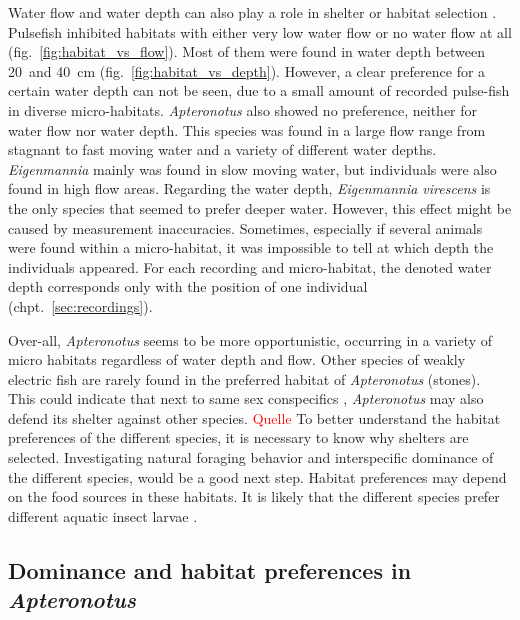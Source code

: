 Water flow and water depth can also play a role in shelter or habitat selection \citep{aadland1993stream}. Pulsefish inhibited habitats with either very low water flow or no water flow at all (fig.~\ref{fig:habitat_vs_flow}).  Most of them were found in water depth between 20~and 40~cm (fig.~\ref{fig:habitat_vs_depth}). However, a clear preference for a certain water depth can not be seen, due to a small amount of recorded pulse-fish in diverse micro-habitats.
\textit{Apteronotus} also showed no preference, neither for water flow nor water depth. This species was found in a large flow range from stagnant to fast moving water and a variety of different water depths.
\textit{Eigenmannia} mainly was found in slow moving water, but individuals were also found in high flow areas. Regarding the water depth, \textit{Eigenmannia virescens} is the only species that seemed to prefer deeper water. However, this effect might be caused by measurement inaccuracies. Sometimes, especially if several animals were found within a micro-habitat, it was impossible to tell at which depth the individuals appeared. For each recording and micro-habitat, the denoted water depth corresponds only with the position of one individual (chpt.~\ref{sec:recordings}).

Over-all, \textit{Apteronotus} seems to be more opportunistic, occurring in a variety of micro habitats regardless of water depth and flow. Other species of weakly electric fish are rarely found in the preferred habitat of \textit{Apteronotus} (stones). This could indicate that next to same sex conspecifics \citep{raab2019}, \textit{Apteronotus} may also defend its shelter against other species. \textcolor{red}{Quelle}
To better understand the habitat preferences of the different species,  it is necessary to know why shelters are selected. Investigating natural foraging behavior and interspecific dominance of the different species, would be a good next step. Habitat preferences may depend on the food sources in these habitats. It is likely that the different species prefer different aquatic insect larvae \citep{marrero1991notas}. 


\subsection{Dominance and habitat preferences in \textit{Apteronotus}}

